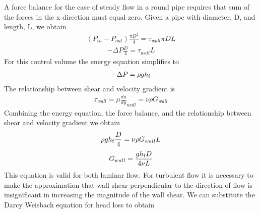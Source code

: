 \documentclass[letterpaper,10pt,english]{sphinxmanual}
\begin{document}
A force balance for the case of steady flow in a round pipe requires that sum of the forces in the x direction must equal zero. Given a pipe with diameter, D, and length, L, we obtain
\begin{equation}\label{equation:Rapid_Mix/RM_Derivations:Rapid_Mix/RM_Derivations:103}
\begin{split}\left(P_{in}- P_{out}\right)\frac{\pi D^2}{4} = \tau_{wall} \pi D L\end{split}
\end{equation}\begin{equation}\label{equation:Rapid_Mix/RM_Derivations:Rapid_Mix/RM_Derivations:104}
\begin{split}-\Delta P\frac{D}{4} = \tau_{wall} L\end{split}
\end{equation}
For this control volume the energy equation simplifies to
\begin{equation}\label{equation:Rapid_Mix/RM_Derivations:Rapid_Mix/RM_Derivations:105}
\begin{split}-\Delta P=\rho g h_{{\rm f}}\end{split}
\end{equation}
The relationship between shear and velocity gradient is
\begin{equation}\label{equation:Rapid_Mix/RM_Derivations:Rapid_Mix/RM_Derivations:106}
\begin{split}\tau_{wall} = \mu \frac{du}{dy}_{wall} = \nu \rho G_{wall}\end{split}
\end{equation}
Combining the energy equation, the force balance, and the relationship between shear and velocity gradient we obtain
\begin{equation}\label{equation:Rapid_Mix/RM_Derivations:Rapid_Mix/RM_Derivations:107}
\begin{split}\rho g h_{{\rm f}}\frac{D}{4} = \nu \rho G_{wall} L\end{split}
\end{equation}\begin{equation}\label{equation:Rapid_Mix/RM_Derivations:Rapid_Mix/RM_Derivations:108}
\begin{split}G_{wall} = \frac{g h_{{\rm f}}D}{4\nu L}\end{split}
\end{equation}
This equation is valid for both laminar flow. For turbulent flow it is necessary to make the approximation that wall shear perpendicular to the direction of flow is insignificant in increasing the magnitude of the wall shear. We can substitute the Darcy Weisbach equation for head loss to obtain
\end{document}
